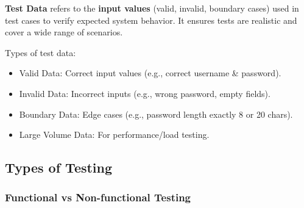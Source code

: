\bigskip

\textbf{Test Data} refers to the \textbf{input values} (valid, invalid, boundary cases) used in test cases to verify expected system behavior. It ensures tests are realistic and cover a wide range of scenarios.

Types of test data:

\begin{itemize}
    \item Valid Data: Correct input values (e.g., correct username \& password).
    \item Invalid Data: Incorrect inputs (e.g., wrong password, empty fields).
    \item Boundary Data: Edge cases (e.g., password length exactly 8 or 20 chars).
    \item Large Volume Data: For performance/load testing.
\end{itemize}

\newpage

\subsection{Types of Testing}

\subsubsection{Functional vs Non-functional Testing}

